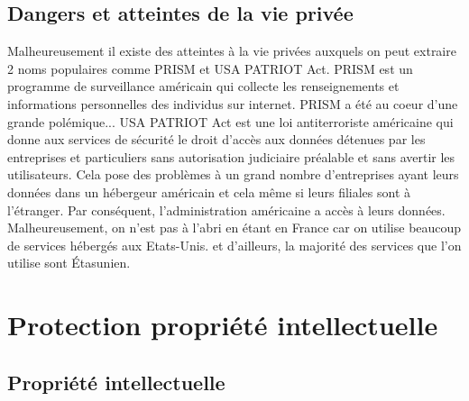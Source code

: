 \documentclass{article}
\begin{document}
\subsection{Dangers et atteintes de la vie privée}
Malheureusement il existe des atteintes à la vie privées auxquels on peut extraire 2 noms populaires comme PRISM et USA PATRIOT Act.
PRISM est un programme de surveillance américain qui collecte les renseignements et informations personnelles des individus sur internet.
PRISM a été au coeur d'une grande polémique... 
USA PATRIOT Act est une loi antiterroriste américaine qui donne aux services de sécurité le droit d'accès aux données détenues par les entreprises et particuliers sans autorisation judiciaire préalable et sans avertir les utilisateurs.
Cela pose des problèmes à un grand nombre d'entreprises ayant leurs données dans un hébergeur américain et cela même si leurs filiales sont à l'étranger. Par conséquent, l'administration américaine a accès à leurs données.
Malheureusement, on n'est pas à l'abri en étant en France car on utilise beaucoup de services hébergés aux Etats-Unis. et d'ailleurs, la majorité des services que l'on utilise sont Étasunien. 

\section{Protection propriété intellectuelle}
\subsection{Propriété intellectuelle}
\end{document}
